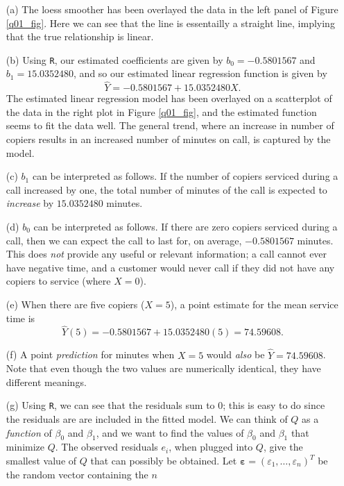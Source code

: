 \documentclass[10pt]{article}
\begin{document}
\begin{itemize}
    \item[(a)] The loess smoother has been overlayed the data in the left panel of Figure \ref{q01_fig}. Here we 
    can see that the line is essentailly a straight line, implying that the true relationship is linear. 
    \item[(b)] Using \texttt{R}, our estimated coefficients are given by \(b_0 = -0.5801567\)
    and \(b_1 = 15.0352480\), and so our estimated linear regression function is given by
    \[\hat{Y} = -0.5801567 + 15.0352480 X.\] The estimated linear regression model has been 
    overlayed on a scatterplot of the data in the right plot in Figure \ref{q01_fig}, and the 
    estimated function seems to fit the data well. The general trend, where an increase in number of 
    copiers results in an increased number of minutes on call, is captured by the model.
    \item[(c)] \(b_1\) can be interpreted as follows. If the number of copiers serviced during
    a call increased by one, the total number of minutes of the call is expected to \textit{increase} by 
    \(15.0352480\) minutes. 
    \item[(d)] \(b_0\) can be interpreted as follows. If there are zero copiers serviced during 
    a call, then we can expect the call to last for, on average, \(-0.5801567 \) minutes. This does \textit{not}
    provide any useful or relevant information; a call cannot ever have negative time, and a customer would never
    call if they did not have any copiers to service (where \(X = 0\)).
    \item[(e)] When there are five copiers (\(X=5\)), a point estimate for the mean service time is 
    \[
        \hat{Y}(5) = -0.5801567 + 15.0352480(5) = 74.59608.
    \]
    \item[(f)] A point \textit{prediction} for minutes when \(X=5\) would \textit{also} be \(\hat{Y} = 74.59608\). Note that
    even though the two values are numerically identical, they have different meanings. 
    \item[(g)] Using \texttt{R}, we can see that the residuals sum to 0; this is easy to do since the residuals are
    are included in the fitted model. We can think of \(Q\) as a \textit{function} 
    of \(\beta_0\) and \(\beta_1\), and we want to find the values of \(\beta_0\) and \(\beta_1\) that minimize \(Q\).
    The observed residuals \(e_i\), when plugged into \(Q\), give the smallest value of \(Q\) that can possibly be obtained. 
    Let \(\bm{\varepsilon} = (\varepsilon_1, \ldots, \varepsilon_n)^T\) be the random vector containing the \(n\) 

\end{itemize}
\end{document}
